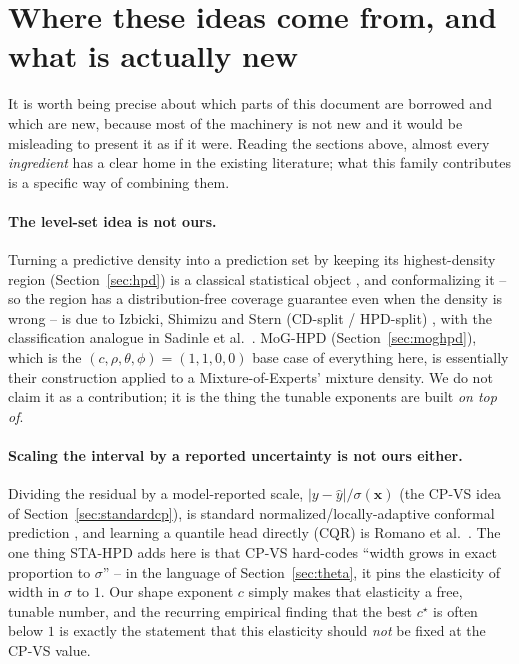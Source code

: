 \documentclass[11pt]{article}
\begin{document}
\section{Where these ideas come from, and what is actually new}
\label{sec:related}

It is worth being precise about which parts of this document are borrowed and which are new,
because most of the machinery is not new and it would be misleading to present it as if it were.
Reading the sections above, almost every \emph{ingredient} has a clear home in the existing
literature; what this family contributes is a specific way of combining them.

\paragraph{The level-set idea is not ours.} Turning a predictive density into a prediction set by
keeping its highest-density region (Section~\ref{sec:hpd}) is a classical statistical object
\cite{boxtiao1973bayesian,hyndman1996computing}, and conformalizing it -- so the region has a
distribution-free coverage guarantee even when the density is wrong -- is due to Izbicki, Shimizu
and Stern (CD-split / HPD-split) \cite{izbicki2020cd}, with the classification analogue in Sadinle
et al.\ \cite{sadinle2019least}. MoG-HPD (Section~\ref{sec:moghpd}), which is the
$(c,\rho,\theta,\phi)=(1,1,0,0)$ base case of everything here, is essentially their construction
applied to a Mixture-of-Experts' mixture density. We do not claim it as a contribution; it is the
thing the tunable exponents are built \emph{on top of}.

\paragraph{Scaling the interval by a reported uncertainty is not ours either.} Dividing the
residual by a model-reported scale, $|y-\hat y|/\sigma(\bm x)$ (the CP-VS idea of
Section~\ref{sec:standardcp}), is standard normalized/locally-adaptive conformal prediction
\cite{lei2018distribution,papadopoulos2011regression}, and learning a quantile head directly (CQR)
is Romano et al.\ \cite{romano2019conformalized}. The one thing STA-HPD adds here is that CP-VS
hard-codes ``width grows in exact proportion to $\sigma$'' -- in the language of
Section~\ref{sec:theta}, it pins the elasticity of width in $\sigma$ to $1$. Our shape exponent $c$
simply makes that elasticity a free, tunable number, and the recurring empirical finding that the
best $c^\star$ is often below $1$ is exactly the statement that this elasticity should \emph{not}
be fixed at the CP-VS value.
\end{document}
